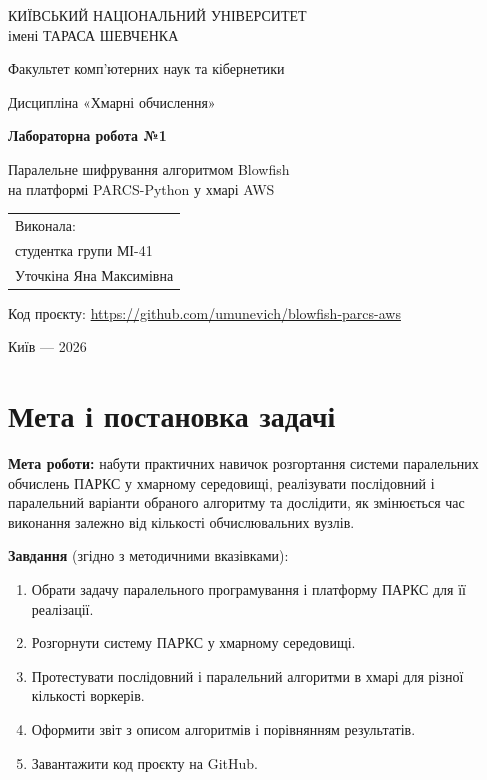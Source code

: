 \documentclass[a4paper,12pt]{article}
\begin{document}
\begin{titlepage}
  \centering
  {\large КИЇВСЬКИЙ НАЦІОНАЛЬНИЙ УНІВЕРСИТЕТ\\ імені ТАРАСА ШЕВЧЕНКА\par}
  \vspace{0.6cm}
  {\large Факультет комп'ютерних наук та кібернетики\par}
  \vspace{4cm}
  {\Large Дисципліна «Хмарні обчислення»\par}
  \vspace{0.8cm}
  {\LARGE\bfseries Лабораторна робота №1\par}
  \vspace{0.6cm}
  {\Large Паралельне шифрування алгоритмом Blowfish\\ на платформі PARCS-Python у хмарі AWS\par}
  \vfill
  \begin{flushright}
    \begin{tabular}{l}
      Виконала:\\
      студентка групи МІ-41\\
      Уточкіна Яна Максимівна
    \end{tabular}
  \end{flushright}
  \vspace{1.5cm}
  {\small Код проєкту: \url{https://github.com/umunevich/blowfish-parcs-aws}\par}
  \vspace{1cm}
  {\large Київ --- 2026\par}
\end{titlepage}

\tableofcontents
\newpage

\section{Мета і постановка задачі}
\textbf{Мета роботи:} набути практичних навичок розгортання системи паралельних
обчислень ПАРКС у хмарному середовищі, реалізувати послідовний і паралельний
варіанти обраного алгоритму та дослідити, як змінюється час виконання залежно від
кількості обчислювальних вузлів.

\textbf{Завдання} (згідно з методичними вказівками):
\begin{enumerate}
  \item Обрати задачу паралельного програмування і платформу ПАРКС для її реалізації.
  \item Розгорнути систему ПАРКС у хмарному середовищі.
  \item Протестувати послідовний і паралельний алгоритми в хмарі для різної кількості воркерів.
  \item Оформити звіт з описом алгоритмів і порівнянням результатів.
  \item Завантажити код проєкту на GitHub.
\end{enumerate}
\end{document}
